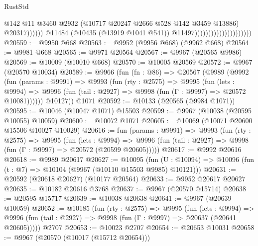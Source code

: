 \begin{lexlean}{RustStd}
\begin{coremodule}
                                                          @142
                                                          @11
                                                          @3460
                                                          @2932
                                                          (@10717
                                                            @20247
                                                            @2666
                                                            @528
                                                            @142
                                                            @3459
                                                            @13886)
                                                          @20317))))))
                                              @11484
                                              (@10435 (@13919 @1041 @541))
                                              @11497)))))))))))))))))))))
@20559 := @9950 @668
@20563 := @9952 (@9956 @668) (@9962 @668)
@20564 := @9981 @668
@20565 := @9971 @20564
@20567 := @9967 (@20565 @9986)
@20569 := @10009 (@10010 @668)
@20570 := @10005 @20569
@20572 := @9967 (@20570 @10034)
@20589 := @9966
    (fun (fn : @86) =>
    @20567
      (@9989
        (@9992
          (fun (params : @9991) =>
          @9993
            (fun (rty : @2575) =>
            @9995
              (fun (lets : @9994) =>
              @9996 (fun (tail : @2927) => @9998 (fun (Γ : @9997) => @20572 @10081))))))
        @10127))
    @1071
@20592 := @10133 (@20565 (@9984 @1071))
@20595 := @10046 (@10047 @1071) @15503
@20599 := @9967 (@10038 (@20595 @10055) @10059)
@20600 := @10072 @1071
@20605 := @10069 (@10071 @20600 @15506 @10027 @10029)
@20616 := fun (params : @9991) =>
  @9993
    (fun (rty : @2575) =>
    @9995
      (fun (lets : @9994) =>
      @9996 (fun (tail : @2927) => @9998 (fun (Γ : @9997) => @20572 (@20599 @20605)))))
@20617 := @9992 @20616
@20618 := @9989 @20617
@20627 := @10095
    (fun (U : @10094) => @10096 (fun (t : @7) => @10104 (@9967 (@10110 @15503 @9985) @10121)))
@20631 := @20592 (@20618 @20627) (@10177 @20564)
@20633 := @9952 @20617 @20627
@20635 := @10182 @20616 @3768
@20637 := @9967 (@20570 @15714)
@20638 := @20595 @15717
@20639 := @10038 @20638
@20641 := @9967 (@20639 @10059)
@20652 := @10185
    (fun (rty : @2575) =>
    @9995
      (fun (lets : @9994) =>
      @9996 (fun (tail : @2927) => @9998 (fun (Γ : @9997) => @20637 (@20641 @20605)))))
    @2707
@20653 := @10023 @2707
@20654 := @20653 @10031
@20658 := @9967 (@20570 (@10017 (@15712 @20654)))

\end{coremodule}
\end{lexlean}
